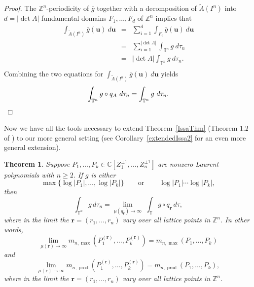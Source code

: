 \documentclass[12pt]{amsart}
\theoremstyle{plain}
\newtheorem{theorem}{Theorem}
\theoremstyle{definition}
\theoremstyle{remark}
\numberwithin{theorem}{section}
\numberwithin{equation}{section} %
\newcommand{\CC}{\mathbb{C}}
\newcommand{\bZ}{{\mathbb{Z}}}
\newcommand{\mb}{\mathbf}
\newcommand{\torus}{{\mathbb{T}}}
\begin{document}
\begin{proof}
The $\bZ^n$-periodicity of $\overline g$ together with a decomposition of $\tilde A(I^n)$ into $d = |\det A|$ fundamental domains $F_1, \ldots, F_d$ of $\bZ^n$ implies that
\begin{eqnarray*}
\int_{\tilde A (I^n)} \overline g\left ( \mb u\right)\ d \mb u
&=&
\sum_{i=1}^{d} \int_{F_i} \overline g (\mb u) \ d\mb u\\
&=&
\sum_{i=1}^{|\det A|} \int_{\torus^n} g \ d\tau_n\\
&=&
|\det A| \int_{\torus^n} g  \ d\tau_n. \\
\end{eqnarray*}
Combining the two equations for $\int_{\tilde A (I^n)} \overline g\left ( \mb u\right)\ d \mb u$ yields
\[\int_{\torus^n} g \circ q_A \ d\tau_n  =  \int_{\torus^n} g  \ d\tau_n. \qedhere \]
\end{proof}




Now we have all the tools necessary to extend Theorem~\ref{IssaThm}  (Theorem 1.2 of \cite{Issa2013}) to our more general setting (see Corollary~\ref{extendedIssa2} for an even more general extension).


\begin{theorem} \label{extendedIssa}
Suppose $P_1, \ldots, P_k \in\CC\left[Z_1^{\pm1},\dots, Z_n^{\pm1}\right]$ are  nonzero Laurent polynomials with $n\ge 2$.
If $g$ is either
    $$
    \max \{ \log|P_1|, \ldots, \log|P_k| \}
    \qquad\text{or}\qquad
    \ \log|P_1| \cdots \log|P_k| ,
    $$
    then
    $$
\int_{\torus^n}  g \, d\tau_n= \lim_{\mu(q_\mb r)\to \infty}\;  \int_\torus g \circ q_{\mb r} \, d \tau,
$$
 where in the limit the $\mb r = (r_1, \ldots, r_n)$ vary over all lattice points in $\bZ^n$. 
 In other words,
    \[\lim_{\mu\left( {\mb r} \right)  \to \infty} m_{n, \max}\left( P_1^{(\mb r)}, \ldots,  P_k^{(\mb r)}\right)
    =
    m_{n, \max}( P_1, \ldots,  P_k)
    \]
    and
    \[
    \lim_{\mu\left( {\mb r} \right)  \to \infty} m_{n, \operatorname{prod}}\left( P_1^{(\mb r)}, \ldots,  P_k^{(\mb r)}\right)
    =m_{n, \operatorname{prod}}(P_1, \ldots, P_k),
    \]
    where in the limit the $\mb r = (r_1, \ldots, r_n)$ vary over all lattice points in $\bZ^n$.
    
    
\end{theorem}
\end{document}
